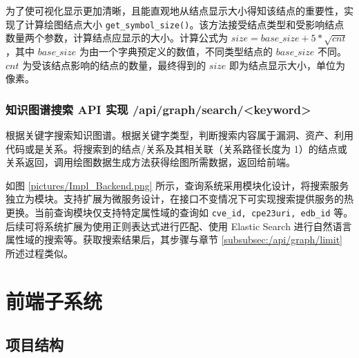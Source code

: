 \documentclass[a4paper,AutoFakeBold,oneside,12pt]{book}
\begin{document}
为了使可视化显示更加清晰，且能直观地从结点显示大小得知该结点的重要性，实现了计算绘图结点大小 \lstinline|get_symbol_size()|。该方法接受结点类型和受影响结点数量两个参数，计算结点应显示的大小。计算公式为 $size=base{\_}size+5*\sqrt{cnt}$，其中 $base{\_}size$ 为由一个字典预定义的数值，不同类型结点的 $base{\_}size$ 不同。$cnt$ 为受该结点影响的结点的数量，最终得到的 $size$ 即为结点显示大小，单位为像素。


\subsubsection{知识图谱搜索 API 实现 /api/graph/search/<keyword>}

根据关键字搜索知识图谱。根据关键字类型，判断搜索内容属于漏洞、资产、利用代码或是关系。将搜索到的结点/关系及其相关联（关系路径长度为 1）的结点或关系返回，调用绘图数据生成方法获得绘图所需数据，返回给前端。


如图 \ref{pictures/Impl_Backend.png} 所示，查询系统采用模块化设计，将搜索服务独立为模块。支持扩展为微服务设计，在接口不变情况下可实现搜索提供服务的热更换。当前查询模块仅支持特定属性域的查询如 \lstinline|cve_id, cpe23uri, edb_id| 等。后续可将系统扩展为使用正则表达式进行匹配、使用 Elastic Search 进行自然语言属性域的搜索等。获取搜索结果后，其步骤与章节 \ref{subsubsec:/api/graph/limit}  所述过程类似。

\clearpage
\section{前端子系统}

\subsection{项目结构}
\end{document}
